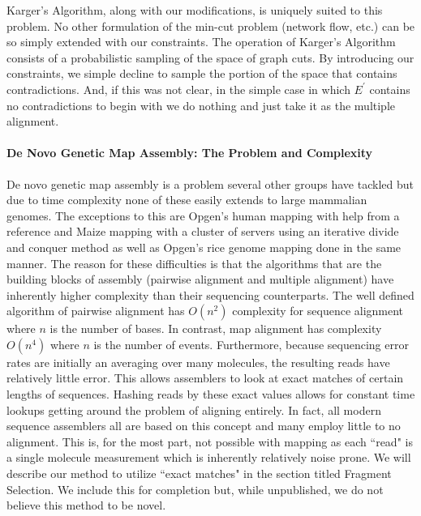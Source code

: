 \documentclass[11pt]{article}
\begin{document}
\par{
Karger's Algorithm, along with our modifications, is uniquely suited to this problem.  No other formulation of the min-cut problem (network flow, etc.) can be so simply extended with our constraints.  The operation of Karger's Algorithm consists of a probabilistic sampling of the space of graph cuts.  By introducing our constraints, we simple decline to sample the portion of the space that contains contradictions.  And, if this was not clear, in the simple case in which $E^\prime$ contains no contradictions to begin with we do nothing and just take it as the multiple alignment.  
}



\paragraph{De Novo Genetic Map Assembly: The Problem and Complexity\newline}
\par{
De novo genetic map assembly is a problem several other groups have tackled\cite{Opgen2}\cite{Opgen3}\cite{OpgenHaplotype}\cite{ValouevRefinement}\cite{ValouevAssembler} but due to time complexity none of these easily extends to large mammalian genomes.  The exceptions to this are Opgen's human mapping with help from a reference\cite{OpgenHuman} and Maize mapping with a cluster of servers using an iterative divide and conquer method\cite{OpgenMaize} as well as Opgen's rice genome mapping done in the same manner.  The reason for these difficulties is that the algorithms that are the building blocks of assembly (pairwise alignment and multiple alignment) have inherently higher complexity than their sequencing counterparts.  The well defined algorithm of pairwise alignment has $O(n^2)$ complexity for sequence alignment where $n$ is the number of bases.  In contrast, map alignment has complexity $O(n^4)$ where $n$ is the number of events. Furthermore, because sequencing error rates are initially an averaging over many molecules, the resulting reads have relatively little error.  This allows assemblers to look at exact matches of certain lengths of sequences. Hashing reads by these exact values allows for constant time lookups getting around the problem of aligning entirely. In fact, all modern sequence assemblers all are based on this concept and many employ little to no alignment.  This is, for the most part, not possible with mapping as each ``read" is a single molecule measurement which is inherently relatively noise prone. We will describe our method to utilize ``exact matches" in the section titled Fragment Selection. We include this for completion but, while unpublished, we do not believe this method to be novel.}
\end{document}
